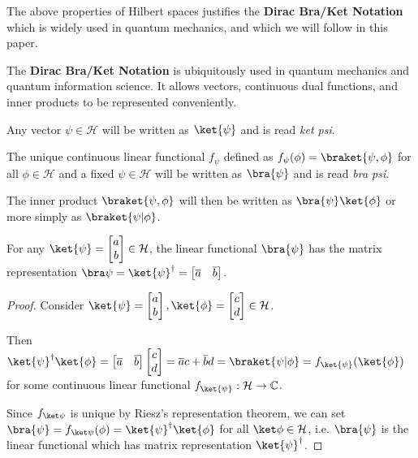The above properties of Hilbert spaces justifies the \textbf{Dirac Bra/Ket Notation} which is widely used in quantum mechanics, and which we will follow in this paper.

\begin{note}
    The \textbf{Dirac Bra/Ket Notation} is ubiquitously used in quantum mechanics and quantum information science. It allows vectors, continuous dual functions, and inner products to be represented conveniently. 

    Any vector $\psi \in \mathcal{H}$ will be written as $\ket{\psi}$ and is read \textit{ket psi}.

    The unique continuous linear functional $f_\psi$ defined as $f_{\psi}(\phi) = \braket{\psi, \phi}$ for all $\phi \in \mathcal{H}$ and a fixed $\psi \in \mathcal{H}$ will be written as $\bra{\psi}$ and is read \textit{bra psi}.

    The inner product $\braket{\psi, \phi}$ will then be written as $\bra{\psi} \ket{\phi}$ or more simply as $\braket{\psi|\phi}$.
\end{note}

\begin{prop}
    For any $\ket{\psi} = \begin{bmatrix} a \\ b\end{bmatrix} \in \mathcal{H}$, the linear functional $\bra{\psi}$ has the matrix representation $\bra\psi = \ket{\psi}^\dagger = \begin{bmatrix} \overline{a} & \overline{b} \end{bmatrix}$. 
\end{prop}
\begin{proof}

    Consider $\ket{\psi} = \begin{bmatrix} a \\ b\end{bmatrix}, \ket{\phi} = \begin{bmatrix} c \\ d \end{bmatrix} \in \mathcal{H}$.

        Then $\ket{\psi}^\dagger \ket{\phi} = \begin{bmatrix}\overline{a} & \overline{b} \end{bmatrix}  \begin{bmatrix} c \\ d \end{bmatrix} = \overline{a} c + \overline{b} d = \braket{\psi|\phi} = f_{\ket{\psi}}(\ket{\phi})$ for some continuous linear functional $f_{\ket{\psi}}: \mathcal{H} \to \mathbb{C}$.

            Since $f_{\ket\psi}$ is unique by Riesz's representation theorem, we can set $\bra{\psi} = f_{\ket\psi}(\phi) = \ket{\psi}^\dagger \ket{\phi}$ for all $\ket\phi \in \mathcal{H}$, i.e. $\bra{\psi}$ is the linear functional which has matrix representation $\ket{\psi}^\dagger$.
\end{proof}
